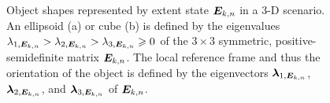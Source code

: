 \documentclass[10pt, twoside, romanappendices]{IEEEtran}
\begin{document}
\begin{figure}
\centering
\vspace*{-5mm}
\captionsetup{singlelinecheck = false, justification=justified}
\vspace{.5mm}
\caption{Object shapes represented by extent state $\M{E}_{k,n}$ in a 3-D scenario. An ellipsoid (a) or cube (b) is defined by the eigenvalues $\lambda_{1,\M{E}_{k,n}} > \lambda_{2,\M{E}_{k,n}} > \lambda_{3,\M{E}_{k,n}} \geq 0 $ of the $3 \times 3$ symmetric, positive-semidefinite matrix $\M{E}_{k,n}$. The local reference frame and thus the orientation of the object is defined by the eigenvectors $\protect\V{\lambda}_{1,\M{E}_{k,n}}$, $\protect\V{\lambda}_{2,\M{E}_{k,n}}$, and $\protect\V{\lambda}_{3,\M{E}_{k,n}}$ of $\M{E}_{k,n}$.}
\label{fig:figure1}
\end{figure}
\end{document}
